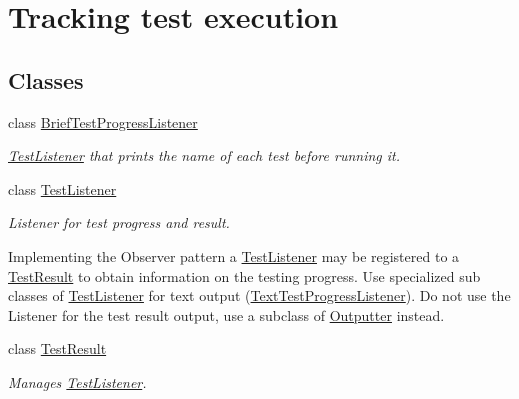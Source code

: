 \hypertarget{group___tracking_test_execution}{\section{Tracking test execution}
\label{group___tracking_test_execution}
}
\subsection*{Classes}
\begin{DoxyCompactItemize}
\item 
class \hyperlink{class_brief_test_progress_listener}{Brief\+Test\+Progress\+Listener}
\begin{DoxyCompactList}\small\item\em \hyperlink{class_test_listener}{Test\+Listener} that prints the name of each test before running it. \end{DoxyCompactList}\item 
class \hyperlink{class_test_listener}{Test\+Listener}
\begin{DoxyCompactList}\small\item\em Listener for test progress and result.

Implementing the Observer pattern a \hyperlink{class_test_listener}{Test\+Listener} may be registered to a \hyperlink{class_test_result}{Test\+Result} to obtain information on the testing progress. Use specialized sub classes of \hyperlink{class_test_listener}{Test\+Listener} for text output (\hyperlink{class_text_test_progress_listener}{Text\+Test\+Progress\+Listener}). Do not use the Listener for the test result output, use a subclass of \hyperlink{class_outputter}{Outputter} instead. \end{DoxyCompactList}\item 
class \hyperlink{class_test_result}{Test\+Result}
\begin{DoxyCompactList}\small\item\em Manages \hyperlink{class_test_listener}{Test\+Listener}.


\end{DoxyCompactList}
\end{DoxyCompactItemize}
